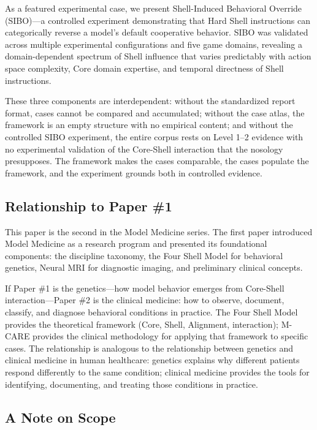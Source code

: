 \documentclass[11pt]{article}
\begin{document}
As a featured experimental case, we present Shell-Induced Behavioral Override (SIBO)---a controlled experiment demonstrating that Hard Shell instructions can categorically reverse a model's default cooperative behavior. SIBO was validated across multiple experimental configurations and five game domains, revealing a domain-dependent spectrum of Shell influence that varies predictably with action space complexity, Core domain expertise, and temporal directness of Shell instructions.

These three components are interdependent: without the standardized report format, cases cannot be compared and accumulated; without the case atlas, the framework is an empty structure with no empirical content; and without the controlled SIBO experiment, the entire corpus rests on Level 1--2 evidence with no experimental validation of the Core-Shell interaction that the nosology presupposes. The framework makes the cases comparable, the cases populate the framework, and the experiment grounds both in controlled evidence.

\subsection{Relationship to Paper \#1}

This paper is the second in the Model Medicine series. The first paper \citep{Jeong2026} introduced Model Medicine as a research program and presented its foundational components: the discipline taxonomy, the Four Shell Model for behavioral genetics, Neural MRI for diagnostic imaging, and preliminary clinical concepts.

If Paper \#1 is the genetics---how model behavior emerges from Core-Shell interaction---Paper \#2 is the clinical medicine: how to observe, document, classify, and diagnose behavioral conditions in practice. The Four Shell Model provides the theoretical framework (Core, Shell, Alignment, interaction); M-CARE provides the clinical methodology for applying that framework to specific cases. The relationship is analogous to the relationship between genetics and clinical medicine in human healthcare: genetics explains why different patients respond differently to the same condition; clinical medicine provides the tools for identifying, documenting, and treating those conditions in practice.

\subsection{A Note on Scope}
\end{document}
